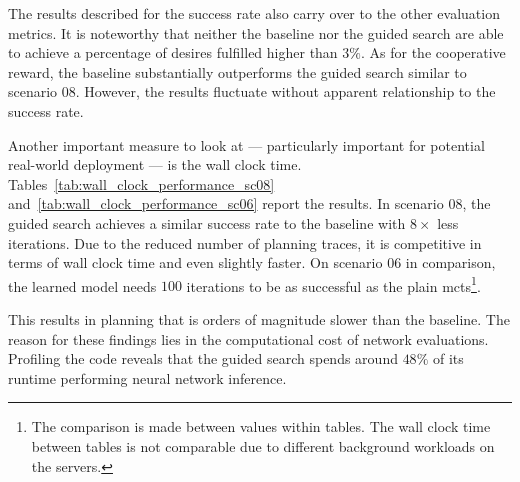 The results described for the success rate also carry over to the other evaluation metrics. It is noteworthy that neither the baseline nor the guided search are able to achieve a percentage of desires fulfilled higher than $3\%$. As for the cooperative reward, the baseline substantially outperforms the guided search similar to scenario 08. However, the results fluctuate without apparent relationship to the success rate.
\begin{table}[h]
 \centering
\caption[Scenario 08 wall clock time performance]{The guided search approach is competitive with the baseline using eight times less iterations and $8s$ less wall clock time.}
\label{tab:wall_clock_performance_sc08}
\end{table}
Another important measure to look at --- particularly important for potential real-world deployment --- is the wall clock time. Tables~\ref{tab:wall_clock_performance_sc08} and~\ref{tab:wall_clock_performance_sc06} report the results. In scenario 08, the guided search achieves a similar success rate to the baseline with $8 \times$ less iterations. Due to the reduced number of planning traces, it is competitive in terms of wall clock time and even slightly faster. On scenario 06 in comparison, the learned model needs $100$ iterations to be as successful as the plain \gls{mcts}\footnote{The comparison is made between values within tables. The wall clock time between tables is not comparable due to different background workloads on the servers.}.
\begin{table}[h]
 \centering
\caption[Scenario 06 wall clock time performance]{The guided search approach performs the same in terms of success percentage compared to the baseline. It requires the same number of iterations which results in non-competitive wall clock time due to the slowness of network evaluations.}
\label{tab:wall_clock_performance_sc06}
\end{table}
This results in planning that is orders of magnitude slower than the baseline. The reason for these findings lies in the computational cost of network evaluations. Profiling the code reveals that the guided search spends around $48\%$ of its runtime performing neural network inference.

